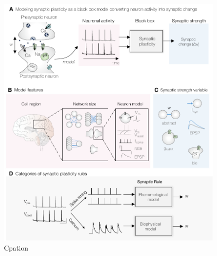 \begin{figure}[h!]
    \centering
    \includegraphics[scale=1]{fig/Methods/FeaturesRecap.pdf}
    \caption{Cpation}
    \label{fig:Methods_FeaturesRacap}
\end{figure}

